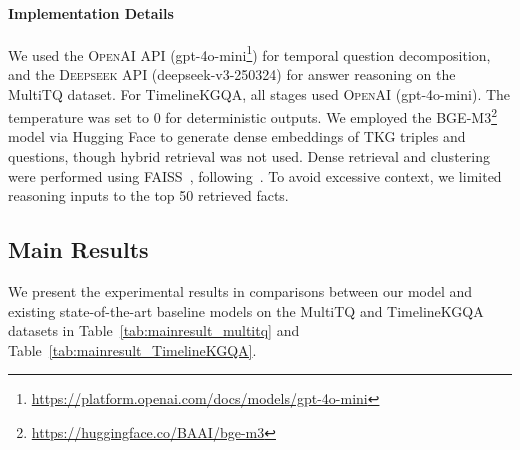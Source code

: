 \documentclass[11pt]{article}
\begin{document}
\paragraph{Implementation Details}
We used the \textsc{OpenAI} API (gpt-4o-mini\footnote{\footnotesize \url{https://platform.openai.com/docs/models/gpt-4o-mini}}) for temporal question decomposition, and the \textsc{Deepseek} API (deepseek-v3-250324) for answer reasoning on the MultiTQ dataset. For TimelineKGQA, all stages used \textsc{OpenAI} (gpt-4o-mini). The temperature was set to 0 for deterministic outputs. We employed the BGE-M3\footnote{\footnotesize \url{https://huggingface.co/BAAI/bge-m3}}~\cite{chen2024bge} model via Hugging Face to generate dense embeddings of TKG triples and questions, though hybrid retrieval was not used. Dense retrieval and clustering were performed using \textsc{FAISS}~\cite{douze2024faiss}, following~\cite{qian2024timer4}. To avoid excessive context, we limited reasoning inputs to the top 50 retrieved facts.





\subsection{Main Results}
We present the experimental results in comparisons between our model and existing state-of-the-art baseline models on the MultiTQ and TimelineKGQA datasets in Table~\ref{tab:mainresult_multitq} and Table~\ref{tab:mainresult_TimelineKGQA}.
\end{document}
